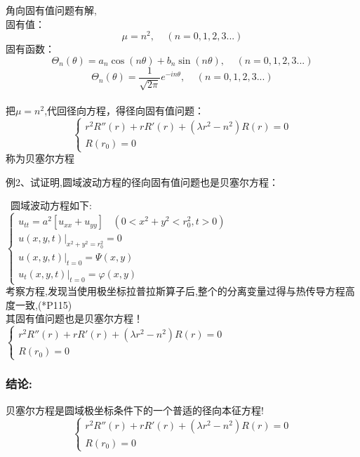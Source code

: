 \begin{frame}
	角向固有值问题有解,\\
	固有值：
	\begin{equation*}
		\mu=n^2, ~~~~~(n=0,1,2,3...)
	\end{equation*}
	固有函数：
	\begin{equation*}
		\Theta_n(\theta) = a_n \cos(n\theta)+b_n \sin(n\theta), ~~~~~(n=0,1,2,3...)
	\end{equation*}
	\begin{equation*}
		\Theta_n(\theta) = \frac{1}{\sqrt{2\pi}} e^{-i n \theta }, ~~~~~(n=0,1,2,3...)
	\end{equation*}
	~\\
	把$\mu=n^2$,代回径向方程，得径向固有值问题：\vspace{0.6em}
	\[ \boxed{ \begin{cases}
		r^2 R'' (r)+r R'(r) +( \lambda r^2 -n^2)R(r)=0  \\
		R(r_0)=0
	\end{cases} }\]	
	称为贝塞尔方程	
\end{frame}	

\begin{frame}
	\begin{exampleblock} {例2、试证明,圆域波动方程的径向固有值问题也是贝塞尔方程：}~ ~
	\end{exampleblock}
	\证~圆域波动方程如下:\\
	$\begin{cases}
		u_{tt}=a^2 [u_{xx}   +u_{yy}] ~~~~ (0< x^2 +y^2 <r_0 ^2, t>0)\\
		u(x,y,t)|_{x^2+y^2=r_0 ^2}= 0 \\
		u(x,y,t)|_{t=0}= \Psi(x,y) \\
		u_t (x,y,t)|_{t=0}= \varphi  (x,y) 
	\end{cases} $\\	\vspace{0.6em}
	考察方程,发现当使用极坐标拉普拉斯算子后,整个的分离变量过得与热传导方程高度一致,(*P115)\\
	其固有值问题也是贝塞尔方程！\\ \vspace{0.6em}
	$\begin{cases}
		r^2 R'' (r)+r R'(r) +( \lambda r^2 -n^2)R(r)=0  \\
		R(r_0)=0
	\end{cases} $\\		
\end{frame}	

\begin{frame}
	\frametitle{结论: }
	贝塞尔方程是圆域极坐标条件下的一个普适的径向本征方程! \\ \vspace{2em}
	\[\begin{cases}
		r^2 R'' (r)+r R'(r) +( \lambda r^2 -n^2)R(r)=0  \\
		R(r_0)=0
	\end{cases}  \]\\	
\end{frame}	

